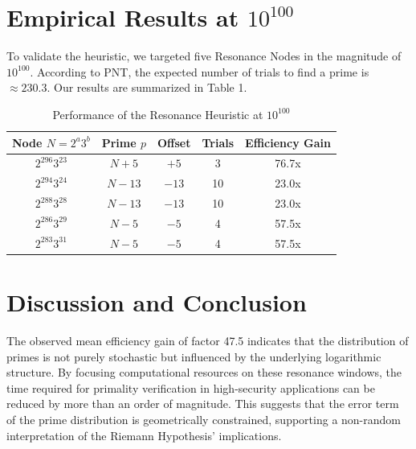\documentclass[11pt,a4paper]{article}
\begin{document}
	\section{Empirical Results at $10^{100}$}
	To validate the heuristic, we targeted five Resonance Nodes in the magnitude of $10^{100}$. According to PNT, the expected number of trials to find a prime is $\approx 230.3$. Our results are summarized in Table 1.
	
	\begin{table}[h]
		\centering
		\caption{Performance of the Resonance Heuristic at $10^{100}$}
		\begin{tabular}{ccccc}
			\toprule
			Node $N = 2^a 3^b$ & Prime $p$ & Offset & Trials & Efficiency Gain \\
			\midrule
			$2^{296} 3^{23}$ & $N + 5$ & $+5$ & 3 & 76.7x \\
			$2^{294} 3^{24}$ & $N - 13$ & $-13$ & 10 & 23.0x \\
			$2^{288} 3^{28}$ & $N - 13$ & $-13$ & 10 & 23.0x \\
			$2^{286} 3^{29}$ & $N - 5$ & $-5$ & 4 & 57.5x \\
			$2^{283} 3^{31}$ & $N - 5$ & $-5$ & 4 & 57.5x \\
			\bottomrule
		\end{tabular}
	\end{table}
	
	\section{Discussion and Conclusion}
	The observed mean efficiency gain of factor 47.5 indicates that the distribution of primes is not purely stochastic but influenced by the underlying logarithmic structure. By focusing computational resources on these resonance windows, the time required for primality verification in high-security applications can be reduced by more than an order of magnitude. This suggests that the error term of the prime distribution is geometrically constrained, supporting a non-random interpretation of the Riemann Hypothesis' implications.
	
\end{document}
